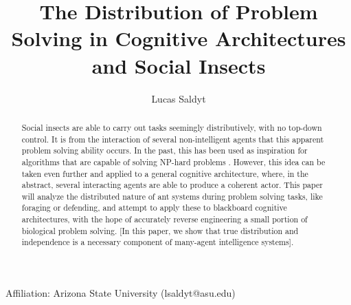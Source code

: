 \documentclass{nature}
\title{The Distribution of Problem Solving in Cognitive Architectures and Social Insects}
\author{Lucas Saldyt}
\begin{document}
\maketitle

\begin{affiliations}
    \item Affiliation: Arizona State University (lsaldyt@asu.edu)
\end{affiliations}

\begin{abstract}
    Social insects are able to carry out tasks seemingly distributively, with no top-down control.
    It is from the interaction of several non-intelligent agents that this apparent problem solving ability occurs.
    In the past, this has been used as inspiration for algorithms that are capable of solving NP-hard problems \cite{dorigo_1997}. 
    However, this idea can be taken even further and applied to a general cognitive architecture, where, in the abstract, several interacting agents are able to produce a coherent actor.
    This paper will analyze the distributed nature of ant systems during problem solving tasks, like foraging or defending, and attempt to apply these to blackboard cognitive architectures, with the hope of accurately reverse engineering a small portion of biological problem solving.
    [In this paper, we show that true distribution and independence is a necessary component of many-agent intelligence systems].


\end{abstract}

\end{document}
